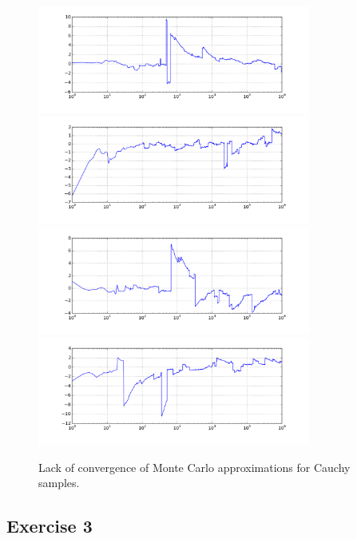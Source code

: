 \documentclass[12pt]{article}
\begin{document}
\begin{figure}
  \begin{center}
    \includegraphics[trim=0 0.6cm 0 0, clip, width=0.8\textwidth]{cauchy2.png}
    \includegraphics[trim=0 0.6cm 0 0, clip, width=0.8\textwidth]{cauchy3.png}
    \includegraphics[trim=0 0.6cm 0 0, clip, width=0.8\textwidth]{cauchy4.png}
    \includegraphics[trim=0 0.6cm 0 0, clip, width=0.8\textwidth]{cauchy5.png}
  \end{center}
  \caption{Lack of convergence of Monte Carlo approximations for Cauchy samples.}
  \label{figure:cauchy}
\end{figure}


\subsection*{Exercise 3}
\end{document}
